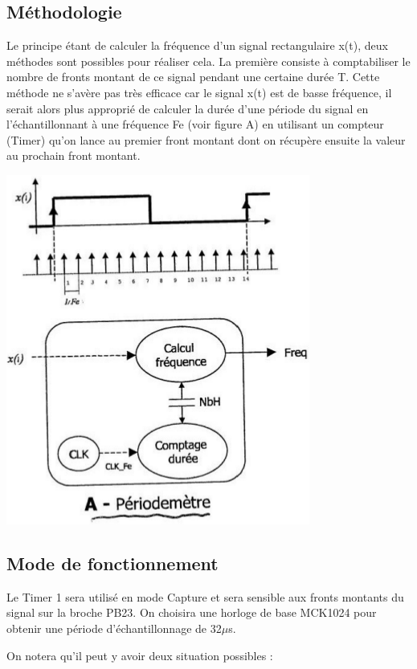 \documentclass[a4paper]{report}
\begin{document}
\subsection{Méthodologie}
Le principe étant de calculer la fréquence d'un signal rectangulaire x(t), deux méthodes sont possibles pour réaliser cela. La première consiste à comptabiliser le nombre de fronts montant de ce signal pendant une certaine durée T.
Cette méthode ne s'avère pas très efficace car le signal x(t) est de basse fréquence, il serait alors plus approprié de calculer la durée d'une période du signal en l'échantillonnant à une fréquence Fe (voir figure A) en utilisant un compteur (Timer) qu'on lance au premier front montant dont on récupère ensuite la valeur au prochain front montant.

\begin{center}
	\includegraphics[scale=0.4]{images/VENT_fig3.png}
\end{center}

\subsection{Mode de fonctionnement}
Le Timer 1 sera utilisé en mode Capture et sera sensible aux fronts montants du signal sur la broche PB23.
On choisira une horloge de base MCK1024 pour obtenir une période d'échantillonnage de 32$\mu$s.

On notera qu'il peut y avoir deux situation possibles :
\end{document}
